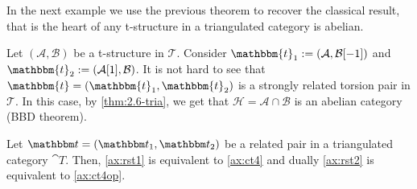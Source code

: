 In the next example we use the previous theorem to recover the classical result, that is the heart of any t-structure in a triangulated category is abelian.

\begin{example}
  Let $(\mathcal{A},\mathcal{B})$ be a t-structure in $\mathcal{T}$. Consider
  $\mathbbm{t}_1:=(\mathcal{A},\mathcal{B}[-1])$ and $\mathbbm{t}_2 :=(\mathcal{A}[1],\mathcal{B})$.
  It is not hard to see that $\mathbbm{t}=(\mathbbm{t}_1,\mathbbm{t}_2)$ is a strongly related
  torsion pair in $\mathcal{T}$. In this case, by \ref{thm:2.6-tria}, we get that $\mathcal{H}=\mathcal{A}\cap\mathcal{B}$
  is an abelian category (BBD theorem).
\end{example}

\begin{lemma}\label{lemma_rst_equiv}
  Let $\t=(\t_1,\t_2)$ be a related pair in a triangulated category $\cat{T}$. Then, \ref{ax:rst1} is equivalent to \ref{ax:ct4} and dually \ref{ax:rst2} is equivalent to \ref{ax:ct4op}.
\end{lemma}
